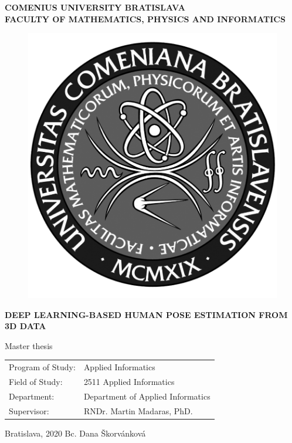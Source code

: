 \documentclass[12pt, a4paper, oneside]{book}
\newcommand\mftitle{Deep Learning-based Human Pose Estimation from 3D Data}
\newcommand\mfthesistype{Master thesis}
\newcommand\mfauthor{Bc. Dana Škorvánková}
\newcommand\mfadvisor{RNDr. Martin Madaras, PhD.}
\newcommand\mfplacedate{Bratislava, 2020}
\newcommand\mfuniversity{COMENIUS UNIVERSITY BRATISLAVA}
\newcommand\mffaculty{FACULTY OF MATHEMATICS, PHYSICS AND INFORMATICS}
\begin{document}
\noindent
\begin{minipage}{\textwidth}
\begin{center}
\textbf{\mfuniversity \\
\mffaculty}
\end{center}
\end{minipage}

\vfill
\begin{figure}[!hbt]
\begin{center}
\includegraphics{images/logo_fmph_dark}
\label{img:logo_dark}
\end{center}
\end{figure}
\begin{center}
\begin{minipage}{0.8\textwidth}
\begin{center}\textbf{\Large\MakeUppercase{\mftitle}}\end{center}
\smallskip
\centerline{\mfthesistype}
\end{minipage}
\end{center}
\vfill
\begin{tabular}{l l}
Program of Study: & Applied Informatics\\
Field of Study: & 2511 Applied Informatics\\
Department: & Department of Applied Informatics\\
Supervisor: & \mfadvisor
\end{tabular}
\vfill
\noindent
\mfplacedate \hfill
\mfauthor
\eject 
\end{document}
